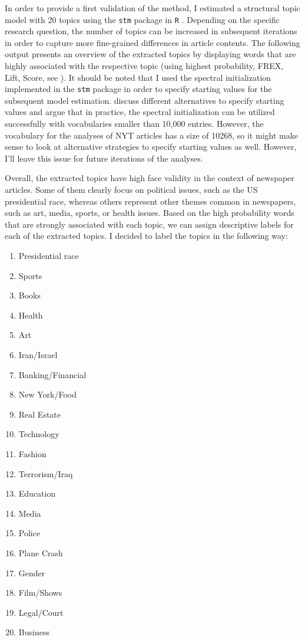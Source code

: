 \documentclass[12pt]{article}
\begin{document}
\begin{doublespace}
In order to provide a first validation of the method, I estimated a structural topic model with 20 topics using the \texttt{stm} package in \texttt{R} \citep{roberts2014structural,roberts2014stm}. Depending on the specific research question, the number of topics can be increased in subsequent iterations in order to capture more fine-grained differences in article contents. The following output presents an overview of the extracted topics by displaying words that are highly associated with the respective topic (using highest probability, FREX, Lift, Score, see \citealt{roberts2014stm}). It should be noted that I used the spectral initialization implemented in the \texttt{stm} package in order to specify starting values for the subsequent model estimation. \citet[12-13]{roberts2014stm} discuss different alternatives to specify starting values and argue that in practice, the spectral initialization can be utilized successfully with vocabularies smaller than 10,000 entries. However, the vocabulary for the analyses of NYT articles has a size of 10268, so it might make sense to look at alternative strategies to specify starting values as well. However, I'll leave this issue for future iterations of the analyses.


Overall, the extracted topics have high face validity in the context of newspaper articles. Some of them clearly focus on political issues, such as the US presidential race, whereas others represent other themes common in newspapers, such as art, media, sports, or health issues. Based on the high probability words that are strongly associated with each topic, we can assign descriptive labels for each of the extracted topics. I decided to label the topics in the following way: 
\begin{enumerate}
\item Presidential race
\item Sports
\item Books
\item Health
\item Art
\item Iran/Israel
\item Banking/Financial
\item New York/Food
\item Real Estate
\item Technology
\item Fashion
\item Terrorism/Iraq
\item Education
\item Media
\item Police
\item Plane Crash
\item Gender
\item Film/Shows
\item Legal/Court
\item Business
\end{enumerate}


\end{doublespace}
\end{document}
